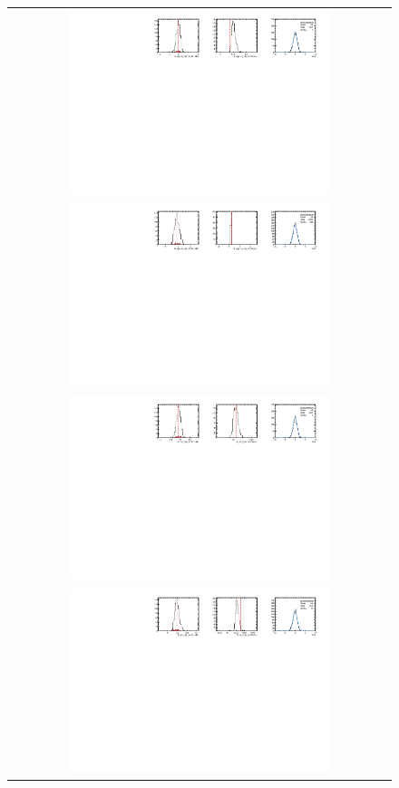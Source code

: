 \begin{figure}
\begin{tabular}{c}
\includegraphics[width=0.7\textwidth]{ANA_resources/Plots/Data_fit/FitterBias//A_signal_pipi_run2.pdf} \\
\includegraphics[width=0.7\textwidth]{ANA_resources/Plots/Data_fit/FitterBias//R_signal_pipi_run2.pdf} \\
\includegraphics[width=0.7\textwidth]{ANA_resources/Plots/Data_fit/FitterBias//A_Bs_pipi_run2.pdf} \\
\includegraphics[width=0.7\textwidth]{ANA_resources/Plots/Data_fit/FitterBias//R_ds_pipi_run2.pdf} \\

\end{tabular}
\end{figure}
